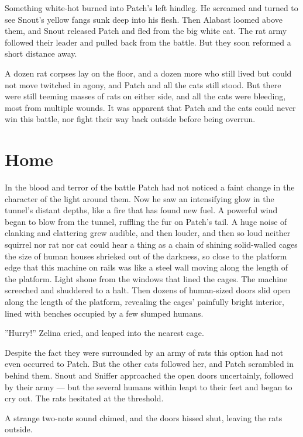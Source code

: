 \documentclass[12pt]{book}
\begin{document}
Something white-hot burned into Patch's left hindleg. He screamed and
turned to see Snout's yellow fangs sunk deep into his flesh. Then
Alabast loomed above them, and Snout released Patch and fled from the
big white cat. The rat army followed their leader and pulled back from
the battle. But they soon reformed a short distance away.

A dozen rat corpses lay on the floor, and a dozen more who still lived
but could not move twitched in agony, and Patch and all the cats still
stood. But there were still teeming masses of rats on either side, and
all the cats were bleeding, most from multiple wounds. It was apparent
that Patch and the cats could never win this battle, nor fight their
way back outside before being overrun.


\section{Home}

In the blood and terror of the battle Patch had not noticed a faint
change in the character of the light around them. Now he saw an
intensifying glow in the tunnel's distant depths, like a fire that has
found new fuel. A powerful wind began to blow from the tunnel,
ruffling the fur on Patch's tail. A huge noise of clanking and
clattering grew audible, and then louder, and then so loud neither
squirrel nor rat nor cat could hear a thing as a chain of shining
solid-walled cages the size of human houses shrieked out of the
darkness, so close to the platform edge that this machine on rails was
like a steel wall moving along the length of the platform. Light shone
from the windows that lined the cages. The machine screeched and
shuddered to a halt. Then dozens of human-sized doors slid open along
the length of the platform, revealing the cages' painfully bright
interior, lined with benches occupied by a few slumped humans.

''Hurry!'' Zelina cried, and leaped into the nearest cage.

Despite the fact they were surrounded by an army of rats this option
had not even occurred to Patch. But the other cats followed her, and
Patch scrambled in behind them. Snout and Sniffer approached the open
doors uncertainly, followed by their army --- but the several humans
within leapt to their feet and began to cry out. The rats hesitated at
the threshold.

A strange two-note sound chimed, and the doors hissed shut, leaving
the rats outside.
\end{document}
